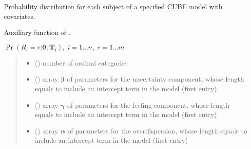 \documentclass[letterpaper,10pt,english]{sphinxmanual}
\begin{document}
\begin{fulllineitems}
\label{\detokenize{cubmods:cubmods.cube_ywz.pmfi}}
\pysigstartsignatures
{}
\pysigstopsignatures
\sphinxAtStartPar
Probability distribution for each subject of a specified CUBE model 
with covariates.

\sphinxAtStartPar
Auxiliary function of .

\sphinxAtStartPar
\(\Pr(R_i=r|\pmb\theta; \pmb T_i),\; i=1 \ldots n ,\; r=1 \ldots m\)
\begin{quote}\begin{description}
\begin{itemize}
\item {} 
\sphinxAtStartPar
{} () \textendash{} number of ordinal categories

\item {} 
\sphinxAtStartPar
{} () \textendash{} array \(\pmb \beta\) of parameters for the uncertainty component, whose length equals 
 to include an intercept term in the model (first entry)

\item {} 
\sphinxAtStartPar
{} () \textendash{} array \(\pmb \gamma\) of parameters for the feeling component, whose length equals 
 to include an intercept term in the model (first entry)

\item {} 
\sphinxAtStartPar
{} () \textendash{} array \(\pmb \alpha\) of parameters for the overdispersion, whose length equals 
 to include an intercept term in the model (first entry)


\end{itemize}
\end{description}
\end{quote}
\end{fulllineitems}
\end{document}
